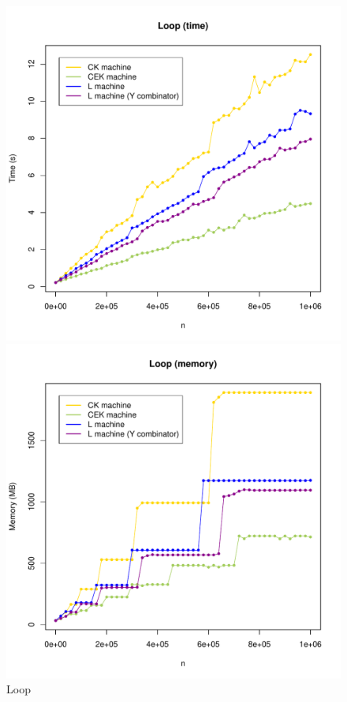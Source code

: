 \documentclass[a4paper]{article}
\begin{document}
\newpage
\begin{figure}[H]
\centering \includegraphics[width=0.7\linewidth]{figs/loop-times.pdf}

\includegraphics[width=0.7\linewidth]{figs/loop-mem.pdf}
\caption{Loop}\label{fig:loop-graphs}
\end{figure}
\newpage
\end{document}
